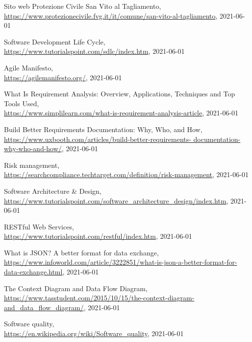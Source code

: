 \documentclass[12pt,a4paper,twoside,english,italian]{book}
\begin{document}
\begin{thebibliography}{99}
\frenchspacing

Sito web Protezione Civile San Vito al Tagliamento, \\\url{https://www.protezionecivile.fvg.it/it/comune/san-vito-al-tagliamento}, 2021-06-01

Software Development Life Cycle, \\\url{https://www.tutorialspoint.com/sdlc/index.htm}, 2021-06-01

Agile Manifesto, \\\url{https://agilemanifesto.org/}, 2021-06-01

What Is Requirement Analysis: Overview, Applications, Techniques and Top Tools Used, \\\url{https://www.simplilearn.com/what-is-requirement-analysis-article}, 2021-06-01

Build Better Requirements Documentation: Why, Who, and How, \\\url{https://www.uxbooth.com/articles/build-better-requirements-
	documentation-why-who-and-how/}, 2021-06-01

Risk management,\\\url{https://searchcompliance.techtarget.com/definition/risk-management}, 2021-06-01

Software Architecture \& Design,\\\url{https://www.tutorialspoint.com/software_architecture_design/index.htm}, 2021-06-01

RESTful Web Services,\\\url{https://www.tutorialspoint.com/restful/index.htm}, 2021-06-01

What is JSON? A better format for data exchange,\\\url{https://www.infoworld.com/article/3222851/what-is-json-a-better-format-for-data-exchange.html}, 2021-06-01

The Context Diagram and Data Flow Diagram, \\\url{https://www.tasstudent.com/2015/10/15/the-context-diagram-and_data_flow_diagram/}, 2021-06-01

Software quality, \\\url{https://en.wikipedia.org/wiki/Software_quality}, 2021-06-01


\end{thebibliography}
\end{document}
